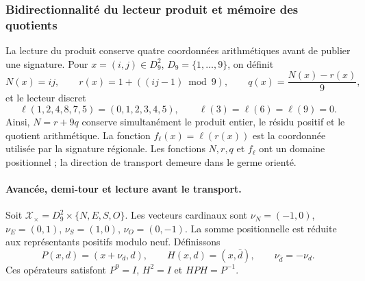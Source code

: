 


\subsubsection{Bidirectionnalité du lecteur produit et mémoire des quotients}
\label{ii:bim09:seccion}

La lecture du produit conserve quatre coordonnées arithmétiques avant de
publier une signature. Pour $x=(i,j)\in D_9^2$, $D_9=\{1,\ldots,9\}$,
on définit
\[
 N(x)=ij,\qquad r(x)=1+((ij-1)\bmod9),\qquad
 q(x)=\frac{N(x)-r(x)}9,
\]
et le lecteur discret
\[
 \ell(1,2,4,8,7,5)=(0,1,2,3,4,5),\qquad
 \ell(3)=\ell(6)=\ell(9)=0.
\]
Ainsi, $N=r+9q$ conserve simultanément le produit entier, le résidu positif
et le quotient arithmétique. La fonction $f_\ell(x)=\ell(r(x))$ est la
coordonnée utilisée par la signature régionale. Les fonctions $N,r,q$ et
$f_\ell$ ont un domaine positionnel ; la direction de transport demeure
dans le germe orienté.

\paragraph{Avancée, demi-tour et lecture avant le transport.}

Soit $\mathscr X_\times=D_9^2\times\{N,E,S,O\}$. Les vecteurs cardinaux
sont $\nu_N=(-1,0)$, $\nu_E=(0,1)$, $\nu_S=(1,0)$,
$\nu_O=(0,-1)$. La somme positionnelle est réduite aux représentants positifs
modulo neuf. Définissons
\[
 P(x,d)=(x+\nu_d,d),\qquad H(x,d)=(x,\bar d),
 \qquad \nu_{\bar d}=-\nu_d.
\]
Ces opérateurs satisfont $P^9=I$, $H^2=I$ et $HPH=P^{-1}$.

